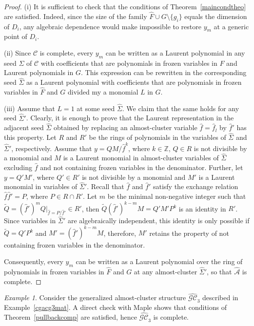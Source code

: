 \documentclass{amsart}
\theoremstyle{definition}
\theoremstyle{remark}
\newtheorem{example}[theorem]{Example}
\numberwithin{equation}{section}
\numberwithin{theorem}{section}
\def\A{{\mathcal A}}
\def\CC{{\mathcal C}}
\def\G{{\mathcal G}}
\def\GCC{{\G\CC}}
\def\Z{{\mathbb Z}}
\begin{document}
\begin{proof}
(i) It is sufficient to check that the conditions of Theorem~\ref{maincondtheo} are satisfied. Indeed, since the size of the family $\widehat F\cup G\setminus\{g_i\}$ equals the dimension of $D_i$, any algebraic dependence would make impossible to restore $y_m$ at a generic point of $D_i$. 

(ii) Since $\CC$ is complete, every $y_m$ can be written as a Laurent polynomial in any seed $\Sigma$ of $\CC$ with coefficients that are polynomials in frozen variables in $F$ and Laurent polynomials in $G$. This expression can be rewritten in the corresponding seed $\widehat\Sigma$ as a Laurent polynomial with coefficients that are polynomials in frozen variables in $\widehat F$ and $G$ divided my a monomial $L$ in $G$.

(iii) Assume that $L=1$ at some seed $\widehat\Sigma$. We claim that the same holds for any seed 
$\widehat\Sigma'$. Clearly, it is enough to prove that the Laurent representation in the adjacent seed 
$\widehat\Sigma$ obtained  by replacing   an almost-cluster variable $\hat f=\hat f_l$ by $\hat f'$ has this property. 
Let $R$ and $R'$ be the rings of polynomials in the variables of $\widehat\Sigma$ and $\widehat\Sigma'$, respectively. Assume that $y=QM/\hat f^k$, where $k\in\Z$, $Q\in R$ is  not divisible by a monomial and $M$ is a Laurent monomial in almost-cluster variables of $\widehat\Sigma$ excluding $\hat f$ and not containing frozen variables in the denominator. Further, let $y=Q'M'$, where $Q'\in R'$ is not divisible by a monomial and $M'$ is a Laurent monomial in variables of 
$\widehat\Sigma'$. Recall that $\hat f$ and $\hat f'$ satisfy the exchange relation $\hat f\hat f'=P$, where 
$P\in R\cap R'$.
Let $m$ be the minimal non-negative integer such that $\tilde Q=(\hat f')^m \left.Q\right|_{\hat f=P/\hat f'}\in R'$, then
$\tilde Q (\hat f')^{k-m}M=Q'M' P^k$ is an identity in $R'$. Since variables in $\widehat\Sigma'$ are algebraically independent, this identity is only possible if $\tilde Q=Q' P^k$ and $M'=(\hat f')^{k-m}M$, therefore, $M'$ retains the property of not containing frozen variables in the denominator.


Consequently, every $y_m$ can be written as a Laurent polynomial over the ring of polynomials in frozen variables in $\widehat F$ and $G$ at any almost-cluster $\widehat\Sigma'$, so that $\widehat\A$ is complete.
\end{proof}

\begin{example}
Consider the generalized almost-cluster structure $\widehat\GCC_3$ described in Example~\ref{cgacg3mat}. 
A direct check with Maple shows that conditions of Theorem~\ref{pullbackcomp} are satisfied, hence $\widehat\GCC_3$ is complete.
\end{example}
\end{document}
